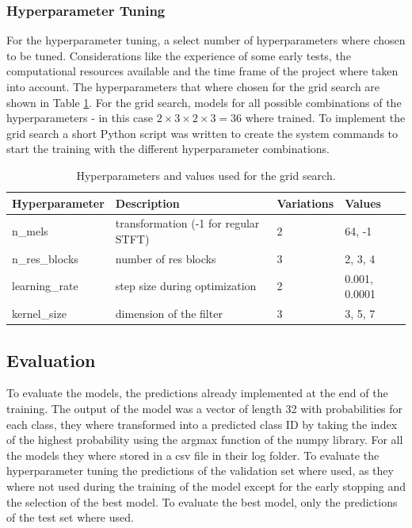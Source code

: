 \subsubsection{Hyperparameter Tuning}%
\label{hyperparameter_tuning}

For the hyperparameter tuning, a select number of hyperparameters where chosen to be tuned.
Considerations like the experience of some early tests, the computational resources available
and the time frame of the project where taken into account. The hyperparameters that where
chosen for the grid search are shown in Table \ref{tab:hyperparameters}. For the grid search,
models for all possible combinations of the hyperparameters - 
in this case \( 2 \times 3 \times 2 \times 3 = 36 \) where trained. To implement the grid search a short Python
script was written to create the system commands to start the training with the different
hyperparameter combinations.
\begin{table}[h]
    \centering
    \caption{Hyperparameters and values used for the grid search.}
    \label{tab:hyperparameters}
    \begin{tabular}{llll}
    \toprule
    \textbf{Hyperparameter} & \textbf{Description}                  & \textbf{Variations}   & \textbf{Values} \\
    \midrule
    n\_mels                 & transformation (-1 for regular STFT)  & 2                     & 64, -1 \\
    n\_res\_blocks          & number of res blocks                  & 3                     & 2, 3, 4 \\
    learning\_rate          & step size during optimization         & 2                     & 0.001, 0.0001 \\
    kernel\_size            & dimension of the filter               & 3                     & 3, 5, 7 \\
    \bottomrule
\end{tabular}

\end{table}

\subsection{Evaluation}%

To evaluate the models, the predictions already implemented at the end of the training.
The output of the model was a vector of length 32 with probabilities for each class, they where
transformed into a predicted class ID by taking the index of the highest probability
using the argmax function of the numpy library. For all the models they where stored in a csv file
in their log folder. To evaluate the hyperparameter tuning the predictions of the validation set
where used, as they where not used during the training of the model except for the early stopping
and the selection of the best model. To evaluate the best model, only the predictions of the test set
where used.

